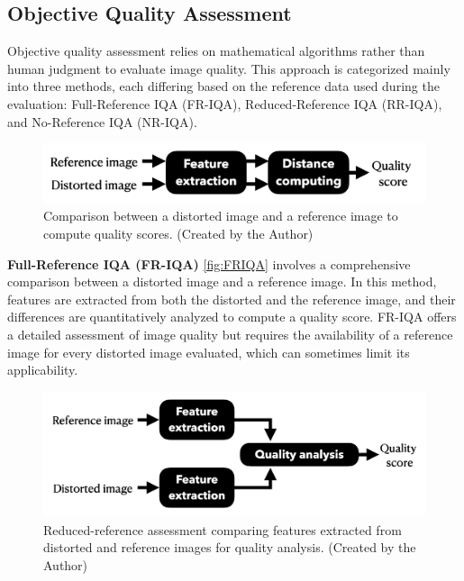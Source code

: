 \subsection{Objective Quality Assessment}
\label{sub:ObjectiveQualityAssessment}
Objective quality assessment relies on mathematical algorithms rather than human judgment to evaluate image quality. This approach is categorized mainly into three methods, each differing based on the reference data used during the evaluation: Full-Reference IQA (FR-IQA), Reduced-Reference IQA (RR-IQA), and No-Reference IQA (NR-IQA). \par
\vspace{\baselineskip}
\begin{figure}[ht]
    \centering
    \includegraphics[keepaspectratio,width=15cm]{img/FRIQA.jpg}
    \caption{Comparison between a distorted image and a reference image to compute quality scores. (Created by the Author)}
    \label{fig:FRIQA}
\end{figure}
\textbf{Full-Reference IQA (FR-IQA)} \autoref{fig:FRIQA}  involves a comprehensive comparison between a distorted image and a reference image. In this method, features are extracted from both the distorted and the reference image, and their differences are quantitatively analyzed to compute a quality score. FR-IQA offers a detailed assessment of image quality but requires the availability of a reference image for every distorted image evaluated, which can sometimes limit its applicability. \par
\vspace{\baselineskip}
\begin{figure}[ht]
    \centering
    \includegraphics[keepaspectratio,width=15cm]{img/RRIQA.jpg}
    \caption{Reduced-reference assessment comparing features extracted from distorted and reference images for quality analysis. (Created by the Author)}
    \label{fig:RRIQA}
\end{figure}
